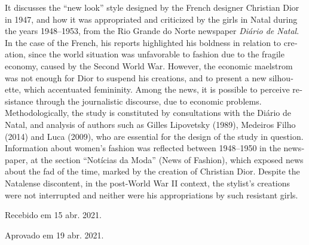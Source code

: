 \begin{refsection}
\begin{otherlanguage}{english}
    \begin{galoResumo}[Abstract]
        It discusses the ``new look'' style designed by the French designer Christian Dior in 1947, and how it was appropriated and criticized by the girls in Natal during the years 1948--1953, from the Rio Grande do Norte newspaper \textit{Diário de Natal}. In the case of the French, his reports highlighted his boldness in relation to creation, since the world situation was unfavorable to fashion due to the fragile economy, caused by the Second World War. However, the economic maelstrom was not enough for Dior to suspend his creations, and to present a new silhouette, which accentuated femininity. Among the news, it is possible to perceive resistance through the journalistic discourse, due to economic problems. Methodologically, the study is constituted by consultations with the Diário de Natal, and analysis of authors such as Gilles Lipovetsky (1989), Medeiros Filho (2014) and Luca (2009), who are essential for the design of the study in question. Information about women's fashion was reflected between 1948--1950 in the newspaper, at the section ``Notícias da Moda'' (News of Fashion), which exposed news about the fad of the time, marked by the creation of Christian Dior. Despite the Natalense discontent, in the post-World War II context, the stylist's creations were not interrupted and neither were his appropriations by such resistant girls. 
    \end{galoResumo}
    
    \end{otherlanguage}

    

    \printbibliography[heading=subbibliography,notcategory=fullcited]

    \hfill Recebido em 15 abr. 2021.

    \hfill Aprovado em 19 abr. 2021.

    \label{chap:vencidonewlookend}

\end{refsection}
